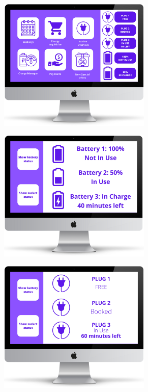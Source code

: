 \documentclass[12pt]{report}
\begin{document}
\begin{figure}[h]
        \centering
        \begin{subfigure}{0.49\textwidth}
        \centering
        \includegraphics[width = 0.8\textwidth]{assets/cpoi1.png}
        \end{subfigure}
        \begin{subfigure}{0.49\textwidth}
        \centering
        \includegraphics[width = 0.8\textwidth]{assets/cpoi2.png}
        \end{subfigure}
         \begin{subfigure}{0.49\textwidth}
        \centering
        \includegraphics[width = 0.8\textwidth]{assets/cpoi3.png}

\end{subfigure}
\end{figure}
\end{document}
